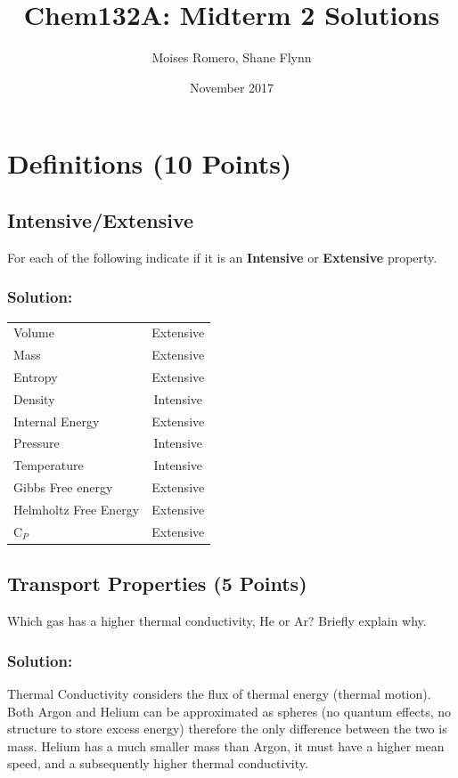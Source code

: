 \documentclass{article}
\title{Chem132A: Midterm 2 Solutions}
\author{Moises Romero, Shane Flynn}
\date{November 2017}
\begin{document}
\maketitle


\section{Definitions \qquad (10 Points)}

\subsection{Intensive/Extensive}
For each of the following indicate if it is an \textbf{Intensive} or \textbf{Extensive} property.

\subsubsection*{Solution:}
\begin{tabular}{ l | c }
    Volume & Extensive\\
    Mass & Extensive\\
    Entropy & Extensive\\
    Density & Intensive\\
    Internal Energy & Extensive\\
    Pressure & Intensive\\
    Temperature & Intensive\\
    Gibbs Free energy & Extensive\\
    Helmholtz Free Energy & Extensive\\
    C$_P$ & Extensive\\
\end{tabular}

\subsection{Transport Properties \qquad (5 Points)}
Which gas has a higher thermal conductivity, He or Ar?		
Briefly explain	why.

\subsubsection*{Solution:}
Thermal Conductivity considers the flux of thermal energy (thermal motion).
Both Argon and Helium can be approximated as spheres (no quantum effects, no structure to store excess energy) therefore the only difference between the two is mass.
Helium has a much smaller mass than Argon, it must have a higher mean speed, and a subsequently higher thermal conductivity. 
\end{document}
